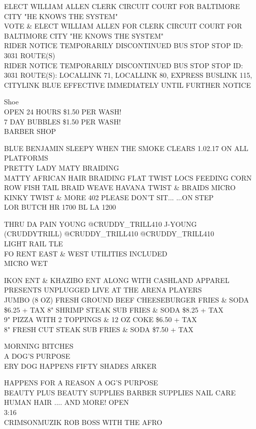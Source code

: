 \documentclass[10pt,letterpaper]{article}
\begin{document}
ELECT WILLIAM ALLEN CLERK CIRCUIT COURT FOR BALTIMORE CITY "HE KNOWS THE SYSTEM"\\
VOTE \& ELECT WILLIAM ALLEN FOR CLERK CIRCUIT COURT FOR BALTIMORE CITY "HE KNOWS THE SYSTEM"\\
RIDER NOTICE TEMPORARILY DISCONTINUED BUS STOP STOP ID: 3031 ROUTE(S)\\
RIDER NOTICE TEMPORARILY DISCONTINUED BUS STOP STOP ID: 3031 ROUTE(S): LOCALLINK 71, LOCALLINK 80, EXPRESS BUSLINK 115, CITYLINK BLUE EFFECTIVE IMMEDIATELY UNTIL FURTHER NOTICE

Shoe\\
OPEN 24 HOURS \$1.50 PER WASH!\\
7 DAY BUBBLES \$1.50 PER WASH!\\
BARBER SHOP

BLUE BENJAMIN SLEEPY WHEN THE SMOKE CLEARS 1.02.17 ON ALL PLATFORMS\\
PRETTY LADY MATY BRAIDING\\
MATTY AFRICAN HAIR BRAIDING FLAT TWIST LOCS FEEDING CORN ROW FISH TAIL BRAID WEAVE HAVANA TWIST \& BRAIDS MICRO KINKY TWIST \& MORE 402 PLEASE DON'T SIT... ...ON STEP\\
LOR BUTCH HR 1700 BL LA 1200

THRU DA PAIN YOUNG @CRUDDY\_TRILL410 J{-}YOUNG (CRUDDYTRILL) @CRUDDY\_TRILL410 @CRUDDY\_TRILL410\\
LIGHT RAIL TLE\\
FO RENT EAST \& WEST UTILITIES INCLUDED\\
MICRO WET

IKON ENT \& KHAZIBO ENT ALONG WITH CASHLAND APPAREL PRESENTS UNPLUGGED LIVE AT THE ARENA PLAYERS\\
JUMBO (8 OZ) FRESH GROUND BEEF CHEESEBURGER FRIES \& SODA \$6.25 + TAX 8" SHRIMP STEAK SUB FRIES \& SODA \$8.25 + TAX\\
9" PIZZA WITH 2 TOPPINGS \& 12 OZ COKE \$6.50 + TAX\\
8" FRESH CUT STEAK SUB FRIES \& SODA \$7.50 + TAX

MORNING BITCHES\\
A DOG'S PURPOSE\\
ERY DOG HAPPENS FIFTY SHADES ARKER

HAPPENS FOR A REASON A OG'S PURPOSE\\
BEAUTY PLUS BEAUTY SUPPLIES BARBER SUPPLIES NAIL CARE HUMAN HAIR .... AND MORE!  OPEN\\
3:16\\
CRIMSONMUZIK ROB BOSS WITH THE AFRO
\end{document}
